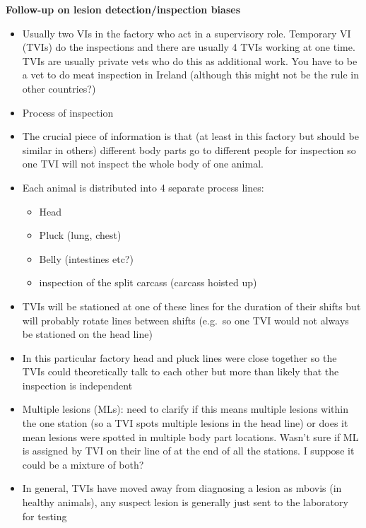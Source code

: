 \documentclass[
  letterpaper,
  DIV=11,
  numbers=noendperiod]{scrreprt}
\providecommand{\tightlist}{%
  \setlength{\itemsep}{0pt}\setlength{\parskip}{0pt}}
\begin{document}
\textbf{Follow-up on lesion detection/inspection biases}

\begin{itemize}
\tightlist
\item
  Usually two VIs in the factory who act in a supervisory role.
  Temporary VI (TVIs) do the inspections and there are usually 4 TVIs
  working at one time. TVIs are usually private vets who do this as
  additional work. You have to be a vet to do meat inspection in Ireland
  (although this might not be the rule in other countries?)
\item
  Process of inspection
\item
  The crucial piece of information is that (at least in this factory but
  should be similar in others) different body parts go to different
  people for inspection so one TVI will not inspect the whole body of
  one animal.
\item
  Each animal is distributed into 4 separate process lines:

  \begin{itemize}
  \tightlist
  \item
    Head
  \item
    Pluck (lung, chest)
  \item
    Belly (intestines etc?)
  \item
    inspection of the split carcass (carcass hoisted up)
  \end{itemize}
\item
  TVIs will be stationed at one of these lines for the duration of their
  shifts but will probably rotate lines between shifts (e.g.~so one TVI
  would not always be stationed on the head line)
\item
  In this particular factory head and pluck lines were close together so
  the TVIs could theoretically talk to each other but more than likely
  that the inspection is independent
\item
  Multiple lesions (MLs): need to clarify if this means multiple lesions
  within the one station (so a TVI spots multiple lesions in the head
  line) or does it mean lesions were spotted in multiple body part
  locations. Wasn't sure if ML is assigned by TVI on their line of at
  the end of all the stations. I suppose it could be a mixture of both?
\item
  In general, TVIs have moved away from diagnosing a lesion as mbovis
  (in healthy animals), any suspect lesion is generally just sent to the
  laboratory for testing
\end{itemize}
\end{document}
